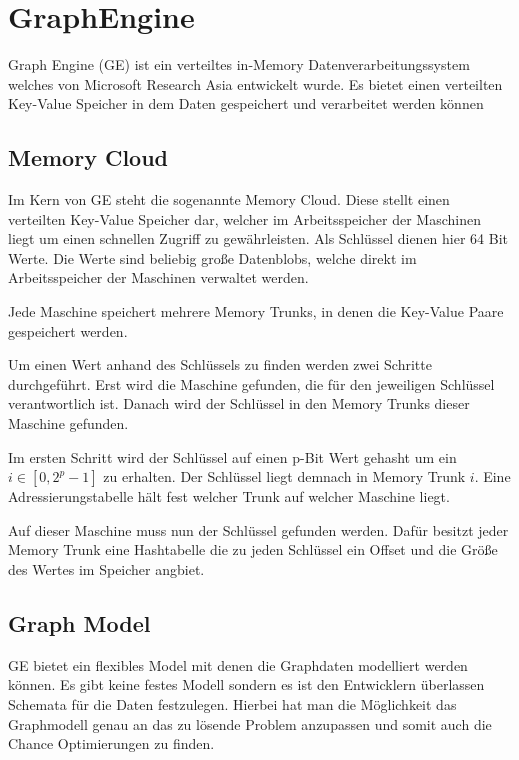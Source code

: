 \section{GraphEngine}

Graph Engine (GE) ist ein verteiltes in-Memory Datenverarbeitungssystem welches von Microsoft Research Asia 
entwickelt wurde. Es bietet einen verteilten Key-Value Speicher in dem Daten gespeichert und verarbeitet werden können

\subsection{Memory Cloud}

Im Kern von GE steht die sogenannte Memory Cloud. Diese stellt einen verteilten Key-Value Speicher dar, welcher im Arbeitsspeicher der Maschinen
liegt um einen schnellen Zugriff zu gewährleisten.
Als Schlüssel dienen hier 64 Bit Werte.
Die Werte sind beliebig große Datenblobs, welche direkt im Arbeitsspeicher der Maschinen verwaltet werden.

Jede Maschine speichert mehrere Memory Trunks, in denen die Key-Value Paare gespeichert werden.

Um einen Wert anhand des Schlüssels zu finden werden zwei Schritte durchgeführt. Erst wird die Maschine gefunden, die für den jeweiligen Schlüssel
verantwortlich ist. Danach wird der Schlüssel in den Memory Trunks dieser Maschine gefunden.

Im ersten Schritt wird der Schlüssel auf einen p-Bit Wert gehasht um ein  $ i \in [0, 2^{p} - 1] $ zu erhalten. Der Schlüssel liegt demnach in
Memory Trunk $ i $. Eine Adressierungstabelle hält fest welcher Trunk auf welcher Maschine liegt.

Auf dieser Maschine muss nun der Schlüssel gefunden werden. Dafür besitzt jeder Memory Trunk eine Hashtabelle die zu jeden Schlüssel
ein Offset und die Größe des Wertes im Speicher angbiet.

\subsection{Graph Model}

GE bietet ein flexibles Model mit denen die Graphdaten modelliert werden können. Es gibt keine festes Modell sondern es ist den Entwicklern
überlassen Schemata für die Daten festzulegen. Hierbei hat man die Möglichkeit das Graphmodell genau an das zu lösende Problem anzupassen und 
somit auch die Chance Optimierungen zu finden.

